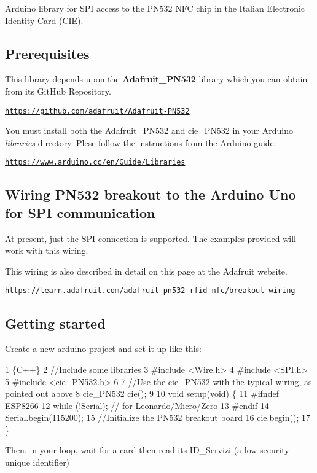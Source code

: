 Arduino library for S\+PI access to the P\+N532 N\+FC chip in the Italian Electronic Identity Card (C\+IE).

\subsection*{Prerequisites}

This library depends upon the {\bfseries Adafruit\+\_\+\+P\+N532} library which you can obtain from its Git\+Hub Repository.

\href{https://github.com/adafruit/Adafruit-PN532}{\tt https\+://github.\+com/adafruit/\+Adafruit-\/\+P\+N532}

You must install both the Adafruit\+\_\+\+P\+N532 and \hyperlink{classcie__PN532}{cie\+\_\+\+P\+N532} in your Arduino {\itshape libraries} directory. Plese follow the instructions from the Arduino guide.

\href{https://www.arduino.cc/en/Guide/Libraries}{\tt https\+://www.\+arduino.\+cc/en/\+Guide/\+Libraries}

\subsection*{Wiring P\+N532 breakout to the Arduino Uno for S\+PI communication}

At present, just the S\+PI connection is supported. The examples provided will work with this wiring.



This wiring is also described in detail on this page at the Adafruit website.

\href{https://learn.adafruit.com/adafruit-pn532-rfid-nfc/breakout-wiring}{\tt https\+://learn.\+adafruit.\+com/adafruit-\/pn532-\/rfid-\/nfc/breakout-\/wiring}

\subsection*{Getting started}

Create a new arduino project and set it up like this\+: 
\begin{DoxyCode}
1 \{C++\}
2 //Include some libraries
3 #include <Wire.h>
4 #include <SPI.h>
5 #include <cie\_PN532.h>
6 
7 //Use the cie\_PN532 with the typical wiring, as pointed out above
8 cie\_PN532 cie();
9 
10 void setup(void) \{
11   #ifndef ESP8266
12     while (!Serial); // for Leonardo/Micro/Zero
13   #endif
14   Serial.begin(115200);
15   //Initialize the PN532 breakout board
16   cie.begin();
17 \}
\end{DoxyCode}
 Then, in your loop, wait for a card then read its I\+D\+\_\+\+Servizi (a low-\/security unique identifier)


